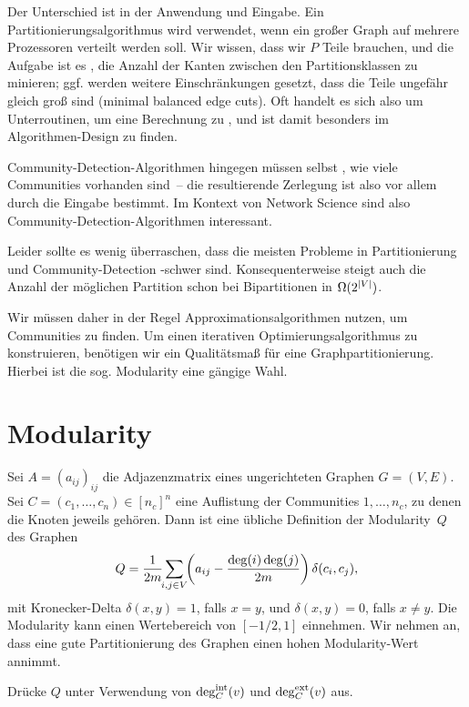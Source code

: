Der Unterschied ist in der Anwendung und Eingabe.
Ein Partitionierungsalgorithmus wird \zB verwendet, wenn ein großer Graph auf mehrere Prozessoren verteilt werden soll.
Wir wissen, dass wir $P$ Teile brauchen, und die Aufgabe ist es \zB, die Anzahl der Kanten zwischen den Partitionsklassen zu minieren;
ggf. werden weitere Einschränkungen gesetzt, \zB dass die Teile ungefähr gleich groß sind (\zB minimal balanced edge cuts).
Oft handelt es sich also um Unterroutinen, um eine Berechnung zu , und ist damit besonders im Algorithmen-Design zu finden.

Community-Detection-Algorithmen hingegen müssen selbst , wie viele Communities vorhanden sind~--
die resultierende Zerlegung ist also vor allem durch die Eingabe bestimmt.
Im Kontext von Network Science sind also Community-Detection-Algorithmen interessant.

Leider sollte es wenig überraschen, dass die meisten Probleme in Partitionierung und Community-Detection \NP-schwer sind.
Konsequenterweise steigt auch die Anzahl der möglichen Partition schon bei Bipartitionen in $\Omega(2^{\lvert V\rvert})$.

Wir müssen daher in der Regel Approximationsalgorithmen nutzen, um Communities zu finden.
Um einen iterativen Optimierungsalgorithmus zu konstruieren, benötigen wir ein Qualitätsmaß für eine Graphpartitionierung.
Hierbei ist die sog. Modularity eine gängige Wahl.

\section{Modularity}
Sei $A = (a_{ij})_{ij}$ die Adjazenzmatrix eines ungerichteten Graphen $G = (V, E)$.
Sei $C = (c_1, \ldots, c_n) \in [n_c]^n$ eine Auflistung der Communities $1, \ldots, n_c$, zu denen die Knoten jeweils gehören.
Dann ist eine übliche Definition der Modularity~$Q$ des Graphen
\begin{equation}
    Q = \frac{1}{2m} \smashoperator{\sum_{i,j \in V}} \left( a_{ij} - \frac{\deg(i)\deg(j)}{2m} \right) \delta(c_i, c_j),
\end{equation}
mit Kronecker-Delta $\delta(x,y) = 1$, falls $x=y$, und $\delta(x,y) = 0$, falls $x \ne y$.
Die Modularity kann einen Wertebereich von $[-1/2, 1]$ einnehmen.
Wir nehmen an, dass eine gute Partitionierung des Graphen einen hohen Modularity-Wert annimmt.

\begin{exercise}
    Drücke $Q$ unter Verwendung von $\deg^{\text{int}}_C(v)$ und $\deg^{\text{ext}}_C(v)$ aus.
\end{exercise}

